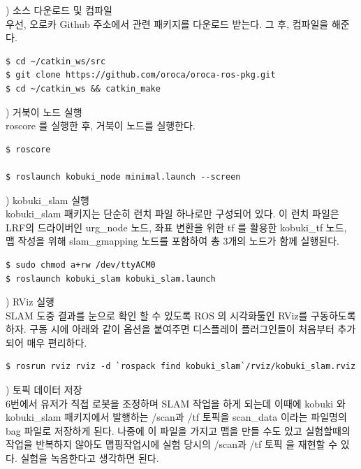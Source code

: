 \setcounter{num}{0}

\vspace{\baselineskip}
\noindent
{}
\thenum) 소스 다운로드 및 컴파일\\
우선, 오로카 Github 주소에서 관련 패키지를 다운로드 받는다. 그 후, 컴파일을 해준다.
\vspace{\baselineskip}
\begin{lstlisting}[language=ROS]
$ cd ~/catkin_ws/src
$ git clone https://github.com/oroca/oroca-ros-pkg.git
$ cd ~/catkin_ws && catkin_make
\end{lstlisting}

\vspace{\baselineskip}
\noindent
{}
\thenum) 거북이 노드 실행\\
roscore 를 실행한 후, 거북이 노드를 실행한다.

\vspace{\baselineskip}
\begin{lstlisting}[language=ROS]
$ roscore

$ roslaunch kobuki_node minimal.launch --screen
\end{lstlisting}

\vspace{\baselineskip}
\noindent
{}
\thenum) kobuki\_slam 실행\\
kobuki\_slam 패키지는 단순히 런치 파일 하나로만 구성되어 있다. 이 런치 파일은 LRF의 드라이버인 urg\_node 노드, 좌표 변환을 위한 tf 를 활용한 kobuki\_tf 노드, 맵 작성을 위해 slam\_gmapping 노드를 포함하여 총 3개의 노드가 함께 실행된다.
\vspace{\baselineskip}
\begin{lstlisting}[language=ROS]
$ sudo chmod a+rw /dev/ttyACM0
$ roslaunch kobuki_slam kobuki_slam.launch
\end{lstlisting}

\vspace{\baselineskip}
\noindent
{}
\thenum) RViz 실행\\
SLAM 도중 결과를 눈으로 확인 할 수 있도록 ROS 의 시각화툴인 RViz를 구동하도록 하자. 구동 시에 아래와 같이 옵션을 붙여주면 디스플레이 플러그인들이 처음부터 추가되어 매우 편리하다.
\vspace{\baselineskip}
\begin{lstlisting}[language=ROS]
$ rosrun rviz rviz -d `rospack find kobuki_slam`/rviz/kobuki_slam.rviz
\end{lstlisting}


\vspace{\baselineskip}
\noindent
{}
\thenum) 토픽 데이터 저장\\
6번에서 유저가 직접 로봇을 조정하며 SLAM 작업을 하게 되는데 이때에 kobuki 와 kobuki\_slam 패키지에서 발행하는 /scan과 /tf 토픽을 scan\_data 이라는 파일명의 bag 파일로 저장하게 된다. 나중에 이 파일을 가지고 맵을 만들 수도 있고 실험할때의 작업을 반복하지 않아도 맵핑작업시에 실험 당시의 /scan과 /tf 토픽 을 재현할 수 있다. 실험을 녹음한다고 생각하면 된다.

